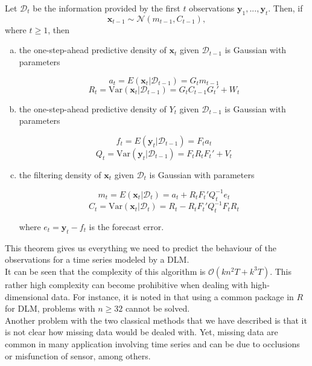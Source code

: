 \documentclass{article}
\begin{document}
\begin{theorem}
Let $\mathcal{D}_t$ be the information provided by the first $t$ observations $\mathbf{y}_1, ..., \mathbf{y}_t$.
Then, if
$$\mathbf{x}_{t-1} \sim \mathcal{N}(m_{t-1}, C_{t-1}),$$
where $t \ge 1$, then

\begin{enumerate}[(a)]

\item the one-step-ahead predictive density of $\mathbf{x}_t$ given $\mathcal{D}_{t-1}$ is Gaussian with parameters

$$a_t = E(\mathbf{x}_t|\mathcal{D}_{t-1}) = G_tm_{t-1}$$
$$R_t = \text{Var}(\mathbf{x}_t|\mathcal{D}_{t-1}) = G_tC_{t-1}G_t' + W_t$$

\item the one-step-ahead predictive density of $Y_t$ given $\mathcal{D}_{t-1}$ is Gaussian with parameters

$$f_t = E(\mathbf{y}_t|\mathcal{D}_{t-1}) = F_ta_t$$
$$Q_t = \text{Var}(\mathbf{y}_t|\mathcal{D}_{t-1}) = F_tR_tF_t' + V_t$$

\item the filtering density of $\mathbf{x}_t$ given $\mathcal{D}_t$ is Gaussian with parameters

$$m_t = E(\mathbf{x}_t|\mathcal{D}_{t}) = a_t + R_tF_t'Q_t^{-1}e_t$$
$$C_t = \text{Var}(\mathbf{x}_t|\mathcal{D}_{t}) = R_t - R_tF_t'Q_t^{-1}F_tR_t$$

where $e_t = \mathbf{y}_t-f_t$ is the forecast error.

\end{enumerate}

\end{theorem}

This theorem gives us everything we need to predict the behaviour of the observations for a time series modeled by a DLM. \\

It can be seen that the complexity of this algorithm is $\mathcal{O}(kn^2T + k^3T)$.
This rather high complexity can become prohibitive when dealing with high-dimensional data. For instance, it is noted in \cite{TRMF} that using a common package in $R$ for DLM, problems with $n \ge 32$ cannot be solved. \\

Another problem with the two classical methods that we have described is that it is not clear how missing data would be dealed with. Yet, missing data are common in many application involving time series and can be due to occlusions or misfunction of sensor, among others. \\
\end{document}
